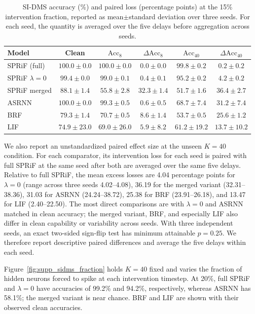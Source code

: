 \documentclass[letterpaper]{article}
\begin{document}
\begin{table}[tbp]
\centering
\small
\setlength{\tabcolsep}{4pt}
\begin{tabular}{lccccc}
\toprule
Model & Clean & $\mathrm{Acc}_{8}$ & $\Delta\mathrm{Acc}_{8}$ & $\mathrm{Acc}_{40}$ & $\Delta\mathrm{Acc}_{40}$ \\
\midrule
SPRiF (full) & $100.0{\pm}0.0$ & $100.0{\pm}0.0$ & $0.0{\pm}0.0$ & $99.8{\pm}0.2$ & $0.2{\pm}0.2$ \\
SPRiF $\lambda{=}0$ & $99.4{\pm}0.0$ & $99.0{\pm}0.1$ & $0.4{\pm}0.1$ & $95.2{\pm}0.2$ & $4.2{\pm}0.2$ \\
SPRiF merged & $88.1{\pm}1.4$ & $55.8{\pm}2.8$ & $32.3{\pm}1.4$ & $51.7{\pm}1.6$ & $36.4{\pm}2.7$ \\
\midrule
ASRNN & $100.0{\pm}0.0$ & $99.3{\pm}0.5$ & $0.6{\pm}0.5$ & $68.7{\pm}7.4$ & $31.2{\pm}7.4$ \\
BRF & $79.3{\pm}1.4$ & $70.7{\pm}0.5$ & $8.6{\pm}1.4$ & $53.7{\pm}0.5$ & $25.6{\pm}1.2$ \\
LIF & $74.9{\pm}23.0$ & $69.0{\pm}26.0$ & $5.9{\pm}8.2$ & $61.2{\pm}19.2$ & $13.7{\pm}10.2$ \\
\bottomrule
\end{tabular}
\caption{SI-DMS accuracy (\%) and paired loss (percentage points) at the 15\% intervention fraction, reported as mean$\pm$standard deviation over three seeds. For each seed, the quantity is averaged over the five delays before aggregation across seeds.}
\label{tab:supp_sidms_results}
\end{table}

We also report an unstandardized paired effect size at the unseen $K=40$ condition. For each comparator, its intervention loss for each seed is paired with full SPRiF at the same seed after both are averaged over the same five delays. Relative to full SPRiF, the mean excess losses are 4.04 percentage points for $\lambda=0$ (range across three seeds 4.02--4.08), 36.19 for the merged variant (32.31--38.36), 31.03 for ASRNN (24.24--38.72), 25.38 for BRF (23.91--26.18), and 13.47 for LIF (2.40--22.50). The most direct comparisons are with $\lambda=0$ and ASRNN matched in clean accuracy; the merged variant, BRF, and especially LIF also differ in clean capability or variability across seeds. With three independent seeds, an exact two-sided sign-flip test has minimum attainable $p=0.25$. We therefore report descriptive paired differences and average the five delays within each seed.

Figure~\ref{fig:supp_sidms_fraction} holds $K=40$ fixed and varies the fraction of hidden neurons forced to spike at each intervention timestep. At 20\%, full SPRiF and $\lambda=0$ have accuracies of 99.2\% and 94.2\%, respectively, whereas ASRNN has 58.1\%; the merged variant is near chance. BRF and LIF are shown with their observed clean accuracies.
\end{document}
